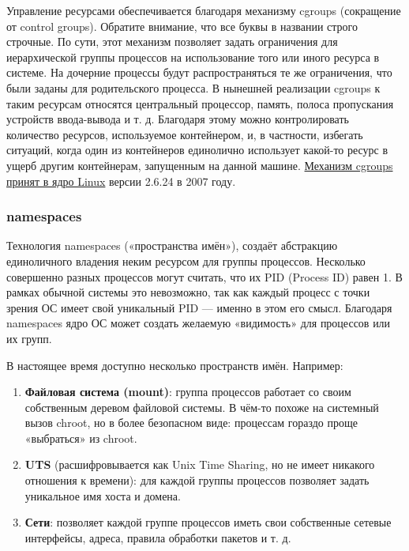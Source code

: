 \documentclass[14pt, a4paper]{article}
\begin{document}
Управление ресурсами обеспечивается благодаря механизму cgroups (сокращение от control groups).
Обратите внимание, что все буквы в названии строго строчные. По сути, этот механизм позволяет
задать ограничения для иерархической группы процессов на использование того или иного ресурса в
системе. На дочерние процессы будут распространяться те же ограничения, что были заданы для
родительского процесса. В нынешней реализации cgroups к таким ресурсам относятся центральный
процессор, память, полоса пропускания устройств ввода-вывода и т. д. Благодаря этому можно
контролировать количество ресурсов, используемое контейнером, и, в частности, избегать ситуаций,
когда один из контейнеров единолично использует какой-то ресурс в ущерб другим контейнерам,
запущенным на данной машине. \href{https://lwn.net/Articles/256389/}{Механизм cgroups принят в ядро Linux} версии 2.6.24 в 2007 году.\\


\begin{centering}
    \subsubsection*{namespaces}
\end{centering}

Технология namespaces («пространства имён»), создаёт абстракцию единоличного владения неким
ресурсом для группы процессов. Несколько совершенно разных процессов могут считать, что их PID
(Process ID) равен 1. В рамках обычной системы это невозможно, так как каждый процесс с точки
зрения ОС имеет свой уникальный PID — именно в этом его смысл. Благодаря namespaces ядро ОС
может создать желаемую «видимость» для процессов или их групп.

В настоящее время доступно несколько пространств имён. Например:
\begin{enumerate}
    \item \textbf{Файловая система (mount)}: группа процессов работает со своим собственным деревом
    файловой системы. В чём-то похоже на системный вызов chroot, но в более безопасном виде:
    процессам гораздо проще «выбраться» из chroot.
    \item \textbf{UTS} (расшифровывается как Unix Time Sharing, но не имеет никакого отношения к времени):
    для каждой группы процессов позволяет задать уникальное имя хоста и домена.
    \item \textbf{Сети}: позволяет каждой группе процессов иметь свои собственные сетевые интерфейсы,
    адреса, правила обработки пакетов и т. д.\\
\end{enumerate}
\end{document}
